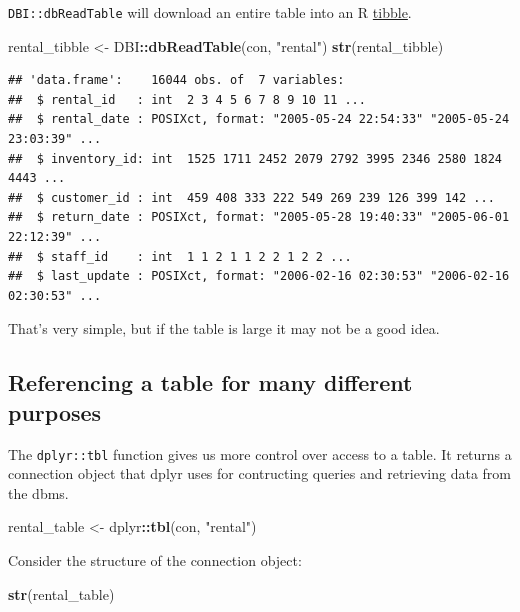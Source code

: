 \documentclass[]{book}
\newenvironment{Shaded}{\begin{snugshade}}{\end{snugshade}}
\newcommand{\KeywordTok}[1]{\textcolor[rgb]{0.13,0.29,0.53}{\textbf{#1}}}
\newcommand{\NormalTok}[1]{#1}
\newcommand{\OperatorTok}[1]{\textcolor[rgb]{0.81,0.36,0.00}{\textbf{#1}}}
\newcommand{\StringTok}[1]{\textcolor[rgb]{0.31,0.60,0.02}{#1}}
\theoremstyle{definition}
\theoremstyle{definition}
\theoremstyle{definition}
\theoremstyle{remark}
\begin{document}
\texttt{DBI::dbReadTable} will download an entire table into an R
\href{https://tibble.tidyverse.org/}{tibble}.

\begin{Shaded}
\begin{Highlighting}[]
\NormalTok{rental_tibble <-}\StringTok{ }\NormalTok{DBI}\OperatorTok{::}\KeywordTok{dbReadTable}\NormalTok{(con, }\StringTok{"rental"}\NormalTok{) }
\KeywordTok{str}\NormalTok{(rental_tibble)}
\end{Highlighting}
\end{Shaded}

\begin{verbatim}
## 'data.frame':    16044 obs. of  7 variables:
##  $ rental_id   : int  2 3 4 5 6 7 8 9 10 11 ...
##  $ rental_date : POSIXct, format: "2005-05-24 22:54:33" "2005-05-24 23:03:39" ...
##  $ inventory_id: int  1525 1711 2452 2079 2792 3995 2346 2580 1824 4443 ...
##  $ customer_id : int  459 408 333 222 549 269 239 126 399 142 ...
##  $ return_date : POSIXct, format: "2005-05-28 19:40:33" "2005-06-01 22:12:39" ...
##  $ staff_id    : int  1 1 2 1 1 2 2 1 2 2 ...
##  $ last_update : POSIXct, format: "2006-02-16 02:30:53" "2006-02-16 02:30:53" ...
\end{verbatim}

That's very simple, but if the table is large it may not be a good idea.

\hypertarget{referencing-a-table-for-many-different-purposes}{%
\subsection{Referencing a table for many different
purposes}\label{referencing-a-table-for-many-different-purposes}}

The \texttt{dplyr::tbl} function gives us more control over access to a
table. It returns a connection object that dplyr uses for contructing
queries and retrieving data from the dbms.

\begin{Shaded}
\begin{Highlighting}[]
\NormalTok{rental_table <-}\StringTok{ }\NormalTok{dplyr}\OperatorTok{::}\KeywordTok{tbl}\NormalTok{(con, }\StringTok{"rental"}\NormalTok{)}
\end{Highlighting}
\end{Shaded}

Consider the structure of the connection object:

\begin{Shaded}
\begin{Highlighting}[]
\KeywordTok{str}\NormalTok{(rental_table)}
\end{Highlighting}
\end{Shaded}
\end{document}
